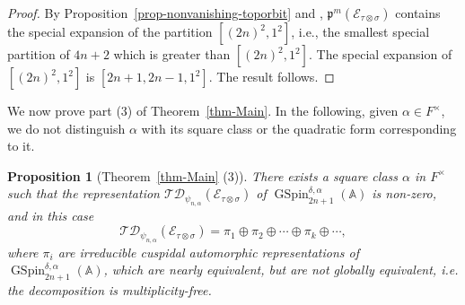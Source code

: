\documentclass[12pt]{amsart}
\newcommand{\A}{\mathbb{A}}
\newcommand{\TD}{\mathcal{TD}}
\newcommand{\CE}{{\mathcal{E}}}
\newtheorem{proposition}[theorem]{Proposition}%
\theoremstyle{remark}
\DeclareMathOperator{\GSpin}{GSpin}
\begin{document}
\begin{proof}
By Proposition~\ref{prop-nonvanishing-toporbit} and \cite[Theorem 11.2]{JiangLiuSavin2016}, $\mathfrak{p}^m(\CE_{\tau \otimes \sigma})$ contains the special expansion of the partition $[(2n)^2,1^2]$, i.e., the smallest special partition of $4n+2$ which is greater than $[(2n)^2,1^2]$. The special expansion of $[(2n)^2,1^2]$ is $[2n+1,2n-1 ,1^2]$. The result follows. 
\end{proof}

We now prove part (3) of Theorem~\ref{thm-Main}. 
In the following, given $\alpha\in F^\times$, we do not distinguish $\alpha$ with its square class or the quadratic form corresponding to it. 

\begin{proposition}[Theorem~\ref{thm-Main} (3)]
\label{prop-nonvanishing}
There exists a square class $\alpha$ in $F^\times$ such that the representation $\TD_{\psi_{n,\alpha}}(\CE_{\tau\otimes\sigma})$ of $\GSpin^{\delta,\alpha}_{2n+1}(\A)$ is non-zero, and in this case
    $$
    \TD_{\psi_{n,\alpha}}(\CE_{\tau\otimes\sigma})=\pi_1\oplus\pi_2\oplus\cdots\oplus\pi_k\oplus\cdots,
    $$
    where $\pi_i$ are irreducible cuspidal automorphic representations of $\GSpin^{\delta,\alpha}_{2n+1}(\A)$, which are nearly equivalent, but
    are not globally equivalent, i.e. the decomposition is multiplicity-free.
\end{proposition}
\end{document}
